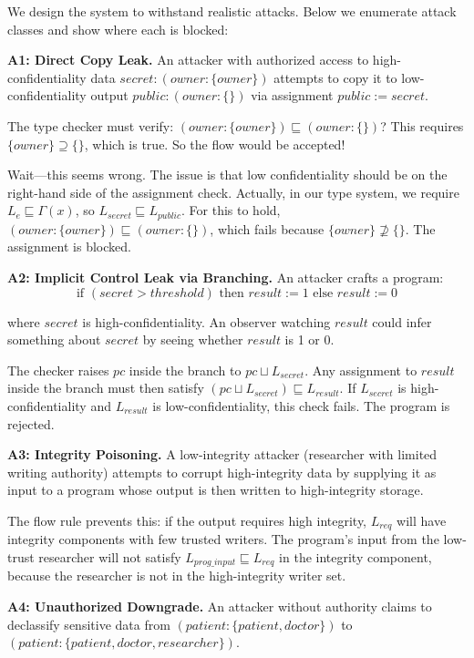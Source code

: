 We design the system to withstand realistic attacks. Below we enumerate attack classes and show where each is blocked:

\textbf{A1: Direct Copy Leak.} An attacker with authorized access to high-confidentiality data $secret: (owner:\{owner\})$ attempts to copy it to low-confidentiality output $public: (owner:\{\})$ via assignment $public := secret$.

The type checker must verify: $(owner:\{owner\}) \sqsubseteq (owner:\{\})$? This requires $\{owner\} \supseteq \{\}$, which is true. So the flow would be accepted!

Wait—this seems wrong. The issue is that low confidentiality should be on the right-hand side of the assignment check. Actually, in our type system, we require $L_e \sqsubseteq \Gamma(x)$, so $L_{secret} \sqsubseteq L_{public}$. For this to hold, $(owner:\{owner\}) \sqsubseteq (owner:\{\})$, which fails because $\{owner\} \not\supseteq \{\}$. The assignment is blocked. \checkmark

\textbf{A2: Implicit Control Leak via Branching.} An attacker crafts a program:
\[\text{if } (secret > threshold) \text{ then } result := 1 \text{ else } result := 0\]

where $secret$ is high-confidentiality. An observer watching $result$ could infer something about $secret$ by seeing whether $result$ is 1 or 0.

The checker raises $pc$ inside the branch to $pc \sqcup L_{secret}$. Any assignment to $result$ inside the branch must then satisfy $(pc \sqcup L_{secret}) \sqsubseteq L_{result}$. If $L_{secret}$ is high-confidentiality and $L_{result}$ is low-confidentiality, this check fails. The program is rejected. \checkmark

\textbf{A3: Integrity Poisoning.} A low-integrity attacker (researcher with limited writing authority) attempts to corrupt high-integrity data by supplying it as input to a program whose output is then written to high-integrity storage.

The flow rule prevents this: if the output requires high integrity, $L_{req}$ will have integrity components with few trusted writers. The program's input from the low-trust researcher will not satisfy $L_{prog\_input} \sqsubseteq L_{req}$ in the integrity component, because the researcher is not in the high-integrity writer set. \checkmark

\textbf{A4: Unauthorized Downgrade.} An attacker without authority claims to declassify sensitive data from $(patient:\{patient,doctor\})$ to $(patient:\{patient,doctor,researcher\})$.

